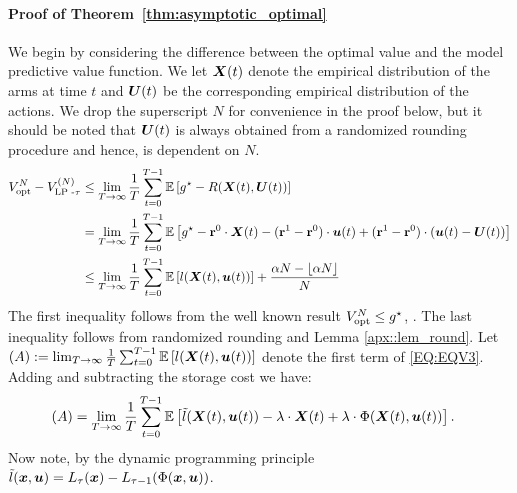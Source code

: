 \paragraph{Proof of Theorem~\ref{thm:asymptotic_optimal}}

 We begin by considering the difference between the optimal value and the model predictive value function. We let ${\bm{X}(t)}$ denote the empirical distribution of the arms at time $t$ and $\bm{U}(t)$ be the corresponding empirical distribution of the actions. We drop the superscript $N$ for convenience in the proof below, but it should be noted that $\bm{U}(t)$ is always obtained from a randomized rounding procedure and hence, is dependent on $N$. 
\begin{align}
\Vopt{N} - \Vlp{\tau}{N} %
&\le \lim_{T\to\infty}\frac{1}{T}\sum_{t = 0}^{T-1} \E \left[g^{\star} - R(\mX(t), \mU(t)) \right]\nonumber\\%
&= \lim_{T\to\infty}\frac{1}{T}\sum_{t = 0}^{T-1} \E \left[g^{\star} - \Rvec{0}\cdot \mX(t) - (\Rvec{1} - \Rvec{0})\cdot\bu(t) +  (\Rvec{1} - \Rvec{0}) \cdot \left(\bu(t) - \bU(t)\right)\right]\nonumber\\
& \le \lim_{T \to \infty} \frac{1}{T}\sum_{t = 0}^{T-1} \E \left[l(\mX(t), \bu(t)) \right] + \frac{\alpha N - \lfloor{\alpha N}\rfloor}{N}\label{EQ:EQV3}
\end{align}
The first inequality follows from the well known result $V_{\text{opt}}^{N} \leq g^{\star}$, \citep{yan2024, GGY23, HXCW23}. The last inequality follows from randomized rounding %
and Lemma \ref{apx::lem_round}.
Let $(A):=\lim_{T\to\infty} \frac{1}{T}\sum_{t = 0}^{T-1} \mathbb{E} \left[l({\bm{X}}(t), \bm{u}(t)) \right]$ denote the first term of \eqref{EQ:EQV3}. Adding and subtracting the storage cost we have:
\begin{align*}
    &(A)  = \lim_{T\to\infty} \frac{1}{T}\sum_{t = 0}^{T-1} \mathbb{E} \left[\Tilde{l}({\bm{X}}(t), \bm{u}(t)) - \lambda\cdot{\bm{X}}(t) + \lambda\cdot\Phi({\bm{X}}(t), \bm{u}(t)) \right].
\end{align*}
Now note, by the dynamic programming principle $\Tilde{l}({\bm{x}}, \bm{u}) = L_{\tau}({\bm{x}}) - L_{\tau - 1}(\Phi({\bm{x}}, \bm{u}))$. 
